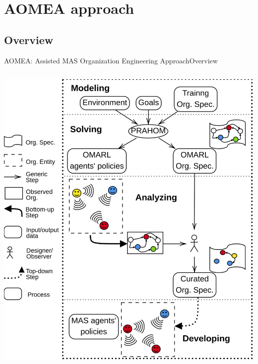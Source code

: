 

\section{AOMEA approach}

\subsection{Overview}

\begin{frame}{AOMEA: Assisted MAS Organization Engineering Approach}{Overview}

    \begin{columns}

        \hspace{-7ex}
        \begin{column}{0.5\textwidth}

            \centering
            \vspace{-23.5ex}
            \includegraphics[width=0.95\linewidth]{figures/AOMEA_illustrative_global_view.png}


\end{column}
\end{columns}
\end{frame}
